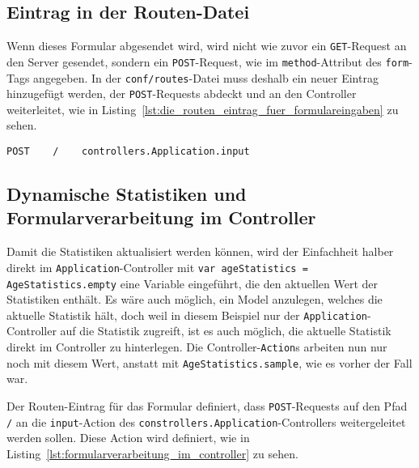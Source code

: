 
\subsection{Eintrag in der Routen-Datei} %
\label{sub:eintrag_in_der_routen_datei}

Wenn dieses Formular abgesendet wird, wird nicht wie zuvor ein \lstinline|GET|-Request an den Server gesendet, sondern ein \lstinline|POST|-Request, wie im \lstinline|method|-Attribut des \lstinline|form|-Tags angegeben.
In der \lstinline|conf/routes|-Datei muss deshalb ein neuer Eintrag hinzugefügt werden, der \lstinline|POST|-Requests abdeckt und an den Controller weiterleitet, wie in Listing~\ref{lst:die_routen_eintrag_fuer_formulareingaben} zu sehen.

\begin{lstlisting}[caption=Die Routen-Eintrag für Formulareingaben, label=lst:die_routen_eintrag_fuer_formulareingaben]
POST    /    controllers.Application.input
\end{lstlisting}


\subsection{Dynamische Statistiken und Formularverarbeitung im Controller} %
\label{sub:formularverarbeitung_im_controller}

Damit die Statistiken aktualisiert werden können, wird der Einfachheit halber direkt im \lstinline|Application|-Controller mit \lstinline|var ageStatistics = AgeStatistics.empty| eine Variable eingeführt, die den aktuellen Wert der Statistiken enthält.
Es wäre auch möglich, ein Model anzulegen, welches die aktuelle Statistik hält, doch weil in diesem Beispiel nur der \lstinline|Application|-Controller auf die Statistik zugreift, ist es auch möglich, die aktuelle Statistik direkt im Controller zu hinterlegen.
Die Controller-\lstinline|Action|s arbeiten nun nur noch mit diesem Wert, anstatt mit \lstinline|AgeStatistics.sample|, wie es vorher der Fall war.

Der Routen-Eintrag für das Formular definiert, dass \lstinline|POST|-Requests auf den Pfad \lstinline|/| an die \lstinline|input|-Action des \lstinline|constrollers.Application|-Controllers weitergeleitet werden sollen.
Diese Action wird definiert, wie in Listing~\ref{lst:formularverarbeitung_im_controller} zu sehen.

